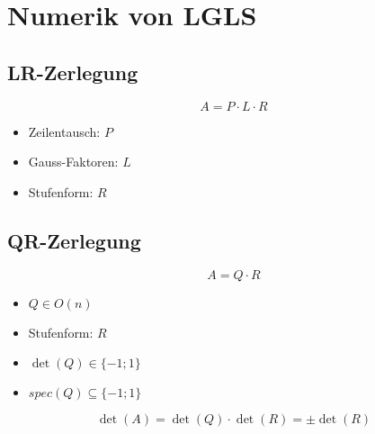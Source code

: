 \section{Numerik von LGLS}

\subsection{LR-Zerlegung}

\begin{displaymath}
	A = P \cdot L \cdot R
\end{displaymath}

\begin{itemize}
    \item Zeilentausch: $P$
    \item Gauss-Faktoren: $L$
    \item Stufenform: $R$
\end{itemize}

\subsection{QR-Zerlegung}

\begin{displaymath}
	A = Q \cdot R
\end{displaymath}

\begin{itemize}
    \item $Q \in O(n)$
    \item Stufenform: $R$
    \item $\det(Q) \in \{ -1; 1 \}$
    \item $spec(Q) \subseteq \{ -1; 1\}$
\end{itemize}

\begin{displaymath}
	\det(A) = \det(Q) \cdot \det(R) = \pm \det(R)
\end{displaymath}